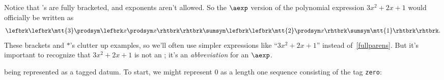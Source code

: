 Notice that \aexp's are fully bracketed, and exponents aren't allowed.  So
the $\aexp$ version of the polynomial expression $3x^2 + 2x + 1$ would
officially be written as
\begin{equation}\label{fullparens}
\lefbrk \lefbrk \mtt{3} \prodsym \lefbrk x \prodsym x\rhtbrk\rhtbrk \sumsym \lefbrk \lefbrk \mtt{2} \prodsym x\rhtbrk \sumsym \mtt{1}\rhtbrk\rhtbrk.
\end{equation}
These brackets and $\ast$'s clutter up examples, so we'll often use
simpler expressions like ``$3x^2 + 2x + 1$'' instead
of~\eqref{fullparens}.  But it's important to recognize that $3x^2 +
2x + 1$ is not an \aexp; it's an \emph{abbreviation} for an $\aexp$.

\iffalse

being represented as
a tagged datum.  To start, we might represent 0 as a length one sequence
consisting of the tag \texttt{zero}:
